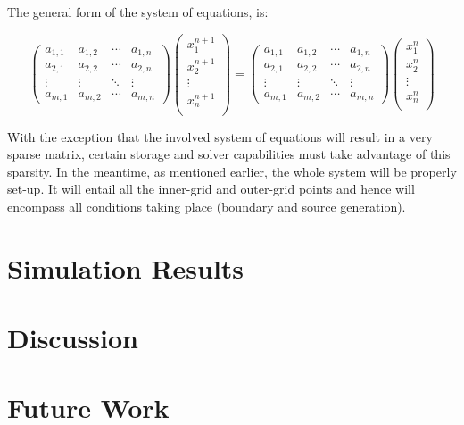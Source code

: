 \documentclass[a4paper,10pt]{IEEEtran}
\begin{document}
	The general form of the system of equations, is:

	\begin{strip}
	\begin{equation}
		\begin{pmatrix}
		a_{1,1} & a_{1,2} & \cdots & a_{1,n} \\
		a_{2,1} & a_{2,2} & \cdots & a_{2,n} \\
		\vdots  & \vdots  & \ddots & \vdots \\
		a_{m,1} & a_{m,2} & \cdots & a_{m,n}
		\end{pmatrix}
		\begin{pmatrix}
		x_1^{n+1} \\
		x_2^{n+1} \\
		\vdots    \\
		x_n^{n+1} \\
		\end{pmatrix}
		= 
		\begin{pmatrix}
		a_{1,1} & a_{1,2} & \cdots & a_{1,n} \\
		a_{2,1} & a_{2,2} & \cdots & a_{2,n} \\
		\vdots  & \vdots  & \ddots & \vdots \\
		a_{m,1} & a_{m,2} & \cdots & a_{m,n}
		\end{pmatrix}
		\begin{pmatrix}
		x_1^{n} \\
		x_2^{n} \\
		\vdots    \\
		x_n^{n} \\
		\end{pmatrix}
	\end{equation}
	\end{strip}
	With the exception that the involved system of equations will result in a very sparse matrix, certain storage and solver capabilities must take advantage of this sparsity. In the meantime, as mentioned earlier, the whole system will be properly set-up. It will entail all the inner-grid and outer-grid points and hence will encompass all conditions taking place (boundary and source generation). 
	
	\section{Simulation Results}
	
	\section{Discussion}
	\section{Future Work}
	
	
	\begin{thebibliography}{1}
		
	\end{thebibliography}
\end{document}

